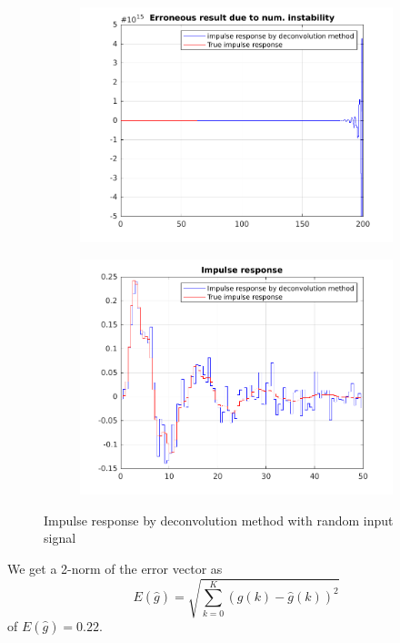 \documentclass{scrartcl}
\begin{document}
\begin{figure}[h]
	\centering
	\begin{subfigure}{.49\textwidth}
		\includegraphics[width=\textwidth]{figures/original_impulse_response.pdf}
		\label{fig:originalimpulse}
	\end{subfigure}
	\begin{subfigure}{.49\textwidth}
		\includegraphics[width=\textwidth]{figures/impulse_response.pdf}
		\label{fig:impulseresponse}
	\end{subfigure}
	\caption{Impulse response by deconvolution method with random input signal}\label{fig:deconvolution}
\end{figure}
\noindent We get a 2-norm of the error vector as
\begin{equation}\label{eq:2-norm}
	E(\hat{g}) = \sqrt{\sum\limits_{k=0}^K \left(g(k) - \hat{g}(k)\right)^2}
\end{equation}
of $E(\hat{g}) = 0.22$.
\end{document}

